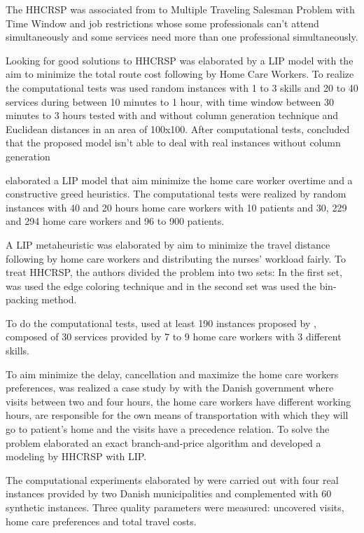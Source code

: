 The \ac{HHCRSP} was associated from  to Multiple Traveling Salesman Problem with Time Window and job restrictions whose some professionals can't attend simultaneously and some services need more than one professional simultaneously.

Looking for good solutions to \ac{HHCRSP} was elaborated by  a \ac{LIP} model with the aim to minimize the total route cost following by Home Care Workers. To realize the computational tests was used random instances with 1 to 3 skills and 20 to 40 services during between 10 minutes to 1 hour, with time window between 30 minutes to 3 hours tested with and without column generation technique and Euclidean distances in an area of 100x100.
After computational tests,  concluded that the proposed model isn't able to deal with real instances without column generation  

 elaborated a \ac{LIP} model that aim minimize the home care worker overtime and a constructive greed heuristics.
The computational tests were realized by random instances with  40 and 20 hours home care workers with 10 patients and 30, 229 and 294 home care workers and 96 to 900 patients.

A \ac{LIP} metaheuristic was elaborated by  aim to minimize the travel distance following by home care workers and distributing the nurses' workload fairly.
To treat \ac{HHCRSP}, the authors divided the problem into two sets: In the first set, was used the edge coloring technique and in the second set was used the bin-packing method.

To do the computational tests,  used at least 190 instances proposed by , composed of 30 services provided by 7 to 9 home care workers with 3 different skills.

To aim minimize the delay, cancellation and maximize the home care workers preferences, was realized a case study by  with the Danish government where visits  between two and four hours, the home care workers have different working hours, are responsible for the own means of transportation with which they will go to patient's home and the visits have a precedence relation.
To solve the problem  elaborated an exact branch-and-price algorithm and developed a modeling by \ac{HHCRSP} with \ac{LIP}.

The computational experiments elaborated by  were carried out with four real instances provided by two Danish municipalities and complemented with 60 synthetic instances. Three quality parameters were measured: uncovered visits, home care preferences and total travel costs.


